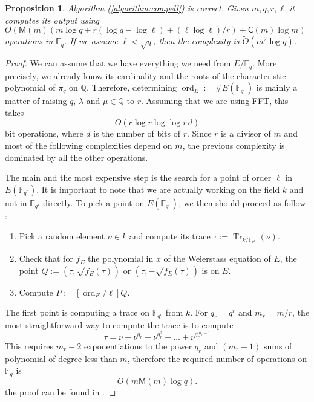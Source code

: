 \documentclass[12pt]{article}
\theoremstyle{plain}
\newtheorem{proposition}[theorem]{Proposition}
\theoremstyle{definition}
\newcommand{\tildO}{\tilde{O}}
\DeclareMathOperator{\trace}{Tr} %
\DeclareMathOperator{\order}{ord} %
\def\Q{\ensuremath{\mathbb{Q}}}
\def\F{\ensuremath{\mathbb{F}}}
\def\MM{\ensuremath{\mathsf{M}}}
\def\CC{\ensuremath{\mathsf{C}}}
\newcounter{algorithm}
\begin{document}
\begin{proposition}
Algorithm (\ref{algorithm:compell}) is correct. Given $m,q,r,\ell$ it computes
its output using $O(\MM(m)(m\log{q}+r(\log{q}-\log{\ell})+
(\ell\log{\ell})/r)+\CC(m)\log{m})$ operations in $\F_q$. If we assume $\ell <
\sqrt{q}$, then the complexity is $\tildO(m^2\log{q})$.
\end{proposition}
\begin{proof}
We can assume that we have everything we need from $E/\F_q$. More precisely, we
already know its cardinality and the roots of the characteristic polynomial of
$\pi_q$ on $\Q$. Therefore, determining $\order_E:=\#E(\F_{q^r})$ is mainly a 
matter of raising $q$, $\lambda$ and $\mu\in\Q$ to $r$. Assuming that we are
using FFT, this takes
\begin{equation}
O(r\log{r}\log{\log{r}}\,d)
\end{equation}
bit operations, where $d$ is the number of bits of $r$. Since $r$ is a divisor
of $m$ and most of the following complexities depend on $m$, the previous
complexity is dominated by all the other operations.

The main and the most expensive step is the search for a point of order $\ell$
in $E(\F_{q^r})$. It is important to note that we are actually working on the
field $k$ and not in $\F_{q^r}$ directly. To pick a point on $E(\F_{q^r})$, we
then should proceed as follow :
\begin{enumerate}
    \item Pick a random element $\nu\in k$ and compute its trace 
$\tau:=\trace_{k/\F_{q^r}}(\nu)$.
    \item Check that for $f_E$ the polynomial in $x$ of the Weierstass equation
of $E$, the point $Q:=(\tau, \sqrt{f_E(\tau)})$ or $(\tau, -\sqrt{f_E(\tau)})$ 
is on $E$.
    \item Compute $P:=[\order_E/\ell]Q$.
\end{enumerate}

The first point is computing a trace on $\F_{q^r}$ from $k$. For $q_r=q^r$ and
$m_r = m/r$, the most straightforward way to compute the trace is to compute 
\[
\tau=\nu+\nu^{q_r}+\nu^{q_r^2}+\dots+\nu^{q_r^{m_r-1}}
\]
This requires $m_r-2$ exponentiations to the power $q_r$ and $(m_r-1)$ 
sums of polynomial of degree less than $m$, therefore the required number of
operations on $\F_q$ is 
\begin{equation}
O(m\MM(m)\log{q}).
\end{equation}
the proof can be found in \cite{Shoup}.


\end{proof}
\end{document}
